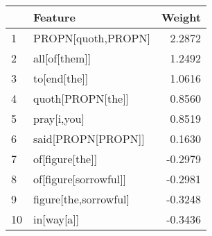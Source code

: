 \begin{tabular}{llr}
\toprule
{} &                Feature &  Weight \\
\midrule
1  &     PROPN[quoth,PROPN] &  2.2872 \\
2  &          all[of[them]] &  1.2492 \\
3  &           to[end[the]] &  1.0616 \\
4  &      quoth[PROPN[the]] &  0.8560 \\
5  &            pray[i,you] &  0.8519 \\
6  &     said[PROPN[PROPN]] &  0.1630 \\
7  &        of[figure[the]] & -0.2979 \\
8  &  of[figure[sorrowful]] & -0.2981 \\
9  &  figure[the,sorrowful] & -0.3248 \\
10 &             in[way[a]] & -0.3436 \\
\bottomrule
\end{tabular}
